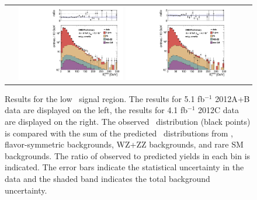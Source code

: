 \begin{figure}[!h]
\begin{center}
\begin{tabular}{cc}
\includegraphics[width=0.45\textwidth]{plots/pfmet_pt40_2012AB_lowMet_all.pdf}
\includegraphics[width=0.45\textwidth]{plots/pfmet_pt40_2012C_lowMet_all.pdf}
\end{tabular}
\caption{\footnotesize Results for the low \MET\ signal region. 
The results for 5.1 fb$^{-1}$ 2012A+B data are displayed on the left, the results for 4.1 fb$^{-1}$ 2012C data are displayed on the right. 
The observed \MET\ distribution (black points) is compared with the sum of the predicted \MET\
distributions from \zjets, flavor-symmetric backgrounds, WZ+ZZ backgrounds, and rare SM backgrounds. 
The ratio of observed to predicted yields in each bin is
indicated. The error bars indicate the statistical uncertainty in the data and the shaded band indicates the total background uncertainty.
\label{fig:results_lowmet}
}
\end{center}
\end{figure}

